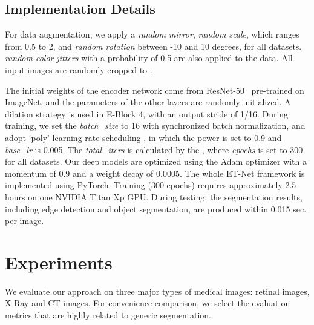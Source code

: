 \documentclass[runningheads,a4paper]{llncs}
\begin{document}
\subsection{Implementation Details}

For data augmentation, we apply a \textit{random mirror}, \textit{random scale}, which ranges from 0.5 to 2, and \textit{random rotation} between -10 and 10 degrees, for all datasets. \textit{random color jitters} with a probability of 0.5 are also applied to the data. All input images are randomly cropped to .

The initial weights of the encoder network come from ResNet-50~\cite{resnet2016he}  pre-trained on ImageNet, and the parameters of the other layers are randomly initialized.
A dilation strategy is used in E-Block 4, with an output stride of 1/16. During training, we set the \textit{batch\_size} to 16 with synchronized batch normalization, and adopt ‘poly’ learning rate scheduling , in which the power is set to 0.9 and \textit{base\_lr} is 0.005. The \textit{total\_iters} is calculated by the , where \textit{epochs} is set to 300 for all datasets. Our deep models are optimized using the Adam optimizer with a momentum of 0.9 and a weight decay of 0.0005. The whole ET-Net framework is implemented using PyTorch. Training (300 epochs) requires approximately 2.5 hours on one NVIDIA Titan Xp GPU. During testing, the segmentation results, including edge detection and object segmentation, are produced within 0.015 sec. per image.

\section{Experiments}
\label{sec:exp}

We evaluate our approach on three major types of medical images: retinal images, X-Ray and CT images. For convenience comparison, we select the evaluation metrics that are highly related to generic segmentation.
\end{document}

